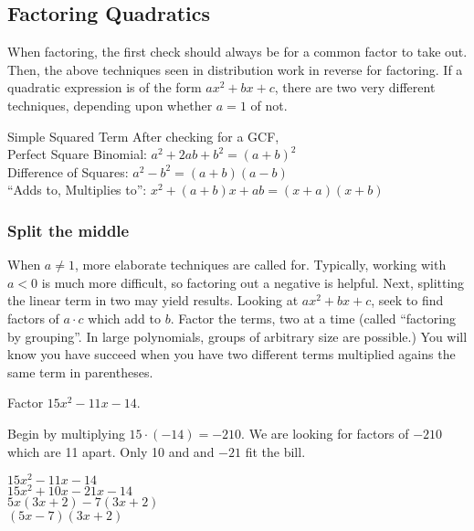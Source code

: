 \subsection{Factoring Quadratics}

When factoring, the first check should always be for a common factor to take out.  Then,
the above techniques seen in distribution work in reverse for factoring.  If a quadratic expression
is of the form $ax^2+bx+c$, there are two very different techniques, depending upon whether
$a=1$ of not.  

\begin{derivation}{Simple Squared Term}
After checking for a GCF,\\
Perfect Square Binomial: $a^2 + 2ab + b^2 = (a+b)^2$\\
Difference of Squares: $a^2 - b^2 = (a+b)(a-b)$\\
``Adds to, Multiplies to'': $x^2 + (a+b)x + ab = (x + a)(x + b)$\\
\end{derivation}

\subsubsection{Split the middle}
When $a\ne1$, more elaborate techniques are called for.  Typically, working with $a<0$ is much
more difficult, so factoring out a negative is helpful.  Next, splitting the linear term in two may
yield results.  Looking at $ax^2+bx+c$, seek to find factors of $a\cdot c$ which add to $b$.  
Factor the terms, two at a time (called ``factoring by grouping''.  In large polynomials, groups of
arbitrary size are possible.)  You will know you have succeed when you have two different
terms multiplied agains the same term in parentheses.

\begin{example}
\exProblem
Factor $15x^2-11x-14$.

\exSolution
Begin by multiplying $15\cdot(-14)=-210$.  We are looking for factors of $-210$ which are 11 apart.
Only 10 and and $-21$ fit the bill.

$15x^2-11x-14$\\
$15x^2+10x-21x-14$\\
$5x(3x+2)-7(3x+2)$\\
$(5x-7)(3x+2)$
\end{example}

